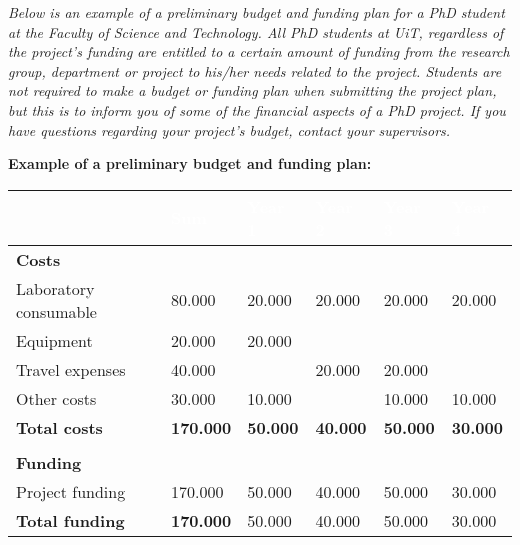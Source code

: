 %
%
\textit{Below is an example of a preliminary budget and funding plan for a PhD student at the Faculty of Science and Technology. All PhD students at UiT, regardless of the project's funding are entitled to a certain amount of funding from the research group, department or project to his/her needs related to the project. Students are not required to make a budget or funding plan when submitting the project plan, but this is to inform you of some of the financial aspects of a PhD project. If you have questions regarding your project's budget, contact your supervisors.}

%
%

\textbf{Example of a preliminary budget and funding plan:}

\begin{tabularx}{\textwidth}{|X|l|l|l|l|l|}
    \hline
    \rowcolor{blue}
     & \textcolor{white}{\textbf{Sum}} & \textcolor{white}{\textbf{Year 1}} & \textcolor{white}{\textbf{Year 2}} & \textcolor{white}{\textbf{Year 3}} & \textcolor{white}{\textbf{Year 4}}\\
     \hline
     \textbf{Costs} & & & & & \\
     \hline
     Laboratory consumable & 80.000 & 20.000 & 20.000 & 20.000 & 20.000 \\
     \hline
     Equipment & 20.000 & 20.000 & & & \\
     \hline
     Travel expenses & 40.000 & & 20.000 & 20.000 & \\
     \hline
     Other costs & 30.000 & 10.000 & & 10.000 & 10.000 \\
     \hline
     \rowcolor{lightblue}
     \textbf{Total costs} & \textbf{170.000} & \textbf{50.000} & \textbf{40.000} & \textbf{50.000} & \textbf{30.000} \\
     \hline
     & & & & & \\
    \hline
    \textbf{Funding} & & & & & \\
    \hline
    Project funding & 170.000 & 50.000 & 40.000 & 50.000 & 30.000 \\
    \hline 
    \rowcolor{lightblue}
    \textbf{Total funding} & \textbf{170.000} & 50.000 & 40.000 & 50.000 & 30.000 \\
    \hline
\end{tabularx}